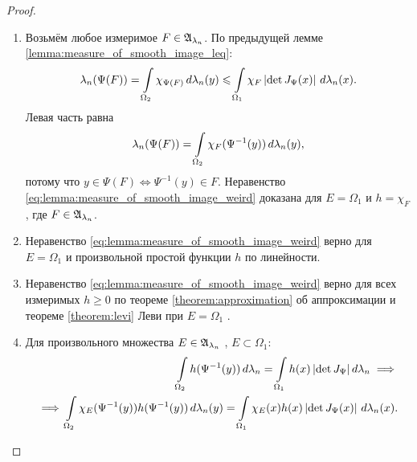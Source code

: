 \begin{proof}\
 \begin{enumerate}
  \item Возьмём любое измеримое $F \in \mathfrak{A}_{\lambda_n}$. По предыдущей лемме \ref{lemma:measure_of_smooth_image_leq}:
   \begin{align*}
    \lambda_n(\Psi(F)) = \int\limits_{\Omega_2} \chi_{\Psi(F)} \, d\lambda_n(y)  \leqslant \int\limits_{\Omega_1} \chi_F \left| \det J_{\Psi}(x) \right| \, d\lambda_n(x)
   .\end{align*} Левая часть равна \begin{align*}
    \lambda_n(\Psi(F))  = \int\limits_{\Omega_2} \chi_F (\Psi^{-1}(y)) \, d\lambda_n(y)  
   ,\end{align*} потому что $y \in \Psi(F) \iff \Psi^{-1}(y) \in F$. Неравенство \eqref{eq:lemma:measure_of_smooth_image_weird} доказана для $E = \Omega_1$ и $h = \chi_F$, где $F \in \mathfrak{A}_{\lambda_n}$.

  \item Неравенство \eqref{eq:lemma:measure_of_smooth_image_weird} верно для $E = \Omega_1$ и произвольной простой функции $h$ по линейности.

  \item Неравенство \eqref{eq:lemma:measure_of_smooth_image_weird} верно для всех измеримых $h \geqslant 0$ по теореме \ref{theorem:approximation} об аппроксимации и теореме \ref{theorem:levi} Леви при $E = \Omega_1$ .

  \item Для произвольного множества $E \in \mathfrak{A}_{\lambda_n}$ , $E \subset \Omega_1$: \begin{align*}
   \int\limits_{\Omega_2} h(\Psi^{-1}(y)) \, d\lambda_n = \int\limits_{\Omega_1} h(x) \left| \det J_{\Psi} \right|     d\lambda_n \implies \\
   \implies \int\limits_{\Omega_2} \chi_E (\Psi^{-1}(y)) h(\Psi^{-1}(y)) \, d\lambda_n(y) = \int\limits_{\Omega_1} \chi_E(x) h(x) \left| \det J_{\Psi}(x) \right| \, d\lambda_n(x)
  .\end{align*} 
 \end{enumerate}
\end{proof}
